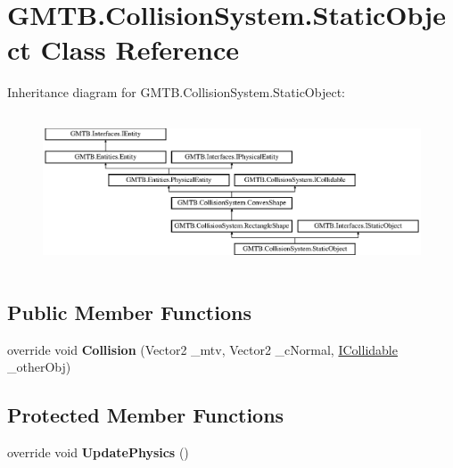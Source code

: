 \hypertarget{class_g_m_t_b_1_1_collision_system_1_1_static_object}{}\section{G\+M\+T\+B.\+Collision\+System.\+Static\+Object Class Reference}
\label{class_g_m_t_b_1_1_collision_system_1_1_static_object}
Inheritance diagram for G\+M\+T\+B.\+Collision\+System.\+Static\+Object\+:\begin{figure}[H]
\begin{center}
\leavevmode
\includegraphics[height=4.609053cm]{class_g_m_t_b_1_1_collision_system_1_1_static_object}
\end{center}
\end{figure}
\subsection*{Public Member Functions}
\begin{DoxyCompactItemize}
\item 
\mbox{\label{class_g_m_t_b_1_1_collision_system_1_1_static_object_a33d9d8892be45f0947a5180e808cb5b4}} 
override void {\bfseries Collision} (Vector2 \+\_\+mtv, Vector2 \+\_\+c\+Normal, \mbox{\hyperlink{interface_g_m_t_b_1_1_collision_system_1_1_i_collidable}{I\+Collidable}} \+\_\+other\+Obj)
\end{DoxyCompactItemize}
\subsection*{Protected Member Functions}
\begin{DoxyCompactItemize}
\item 
\mbox{\label{class_g_m_t_b_1_1_collision_system_1_1_static_object_a677e4512868792c792541ba7d6ba766e}} 
override void {\bfseries Update\+Physics} ()
\end{DoxyCompactItemize}
